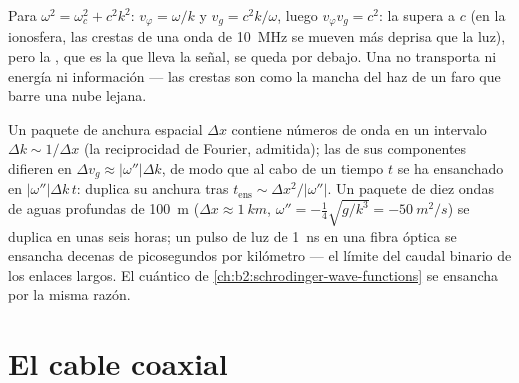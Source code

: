 \begin{example}\label{ex:b2:dispersion-wave-packets:superluminal}
Para $\omega^2 = \omega_c^2 + c^2k^2$: $v_\varphi = \omega/k$ y $v_g = c^2k/\omega$, luego
$v_\varphi v_g = c^2$: la  supera a $c$ (en la ionosfera, las
crestas de una onda de \qty{10}{MHz} se mueven más deprisa que la luz),
pero la , que es la que lleva la señal, se queda por
debajo. Una  no transporta ni energía ni información ---
las crestas son como la mancha del haz de un faro que barre una nube lejana.
\end{example}

\begin{remark}[El ensanchamiento]\label{rem:b2:dispersion-wave-packets:spreading}
Un paquete de anchura espacial $\Delta x$ contiene números de onda en un intervalo $\Delta k \sim
1/\Delta x$ (la reciprocidad de Fourier, admitida); las  de sus componentes difieren en $\Delta v_g \approx |\omega''|\Delta k$, de modo que al cabo de un tiempo $t$
se ha ensanchado en $|\omega''|\Delta k\,t$: duplica su anchura tras $t_{\text{ens}}
\sim \Delta x^2/|\omega''|$. Un paquete de diez ondas de aguas profundas de \qty{100}{m}
($\Delta x \approx \qty{1}{km}$, $\omega'' = -\tfrac14\sqrt{g/k^3} = \qty{-50}{m^2/s}$)
se duplica en unas seis horas; un pulso de luz de \qty{1}{ns} en una
fibra óptica se ensancha decenas de picosegundos por kilómetro --- el
límite del caudal binario de los enlaces largos. El  cuántico de
\cref{ch:b2:schrodinger-wave-functions} se ensancha por la misma razón.
\end{remark}

\section{El cable coaxial}

